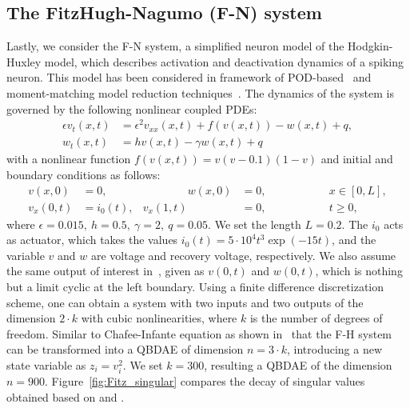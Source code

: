 \subsection{The FitzHugh-Nagumo (F-N) system}
Lastly, we consider the F-N system, a simplified neuron model of the Hodgkin-Huxley model, which describes activation and deactivation dynamics of a spiking neuron. This model has been considered in framework of POD-based~\cite{morChaS10} and moment-matching model reduction techniques~\cite{morBenB12a}. The dynamics of the system is governed by the following nonlinear coupled PDEs:
\begin{equation}
\begin{aligned}
\epsilon v_t(x,t) & =\epsilon^2v_{xx}(x,t) + f(v(x,t)) -w(x,t) + q,\\
w_t(x,t) &= hv(x,t) -\gamma w(x,t) + q
\end{aligned}
\end{equation}
with a nonlinear function $f(v(x,t)) = v(v-0.1)(1-v)$  and initial and boundary conditions as follows:
\begin{equation}
\begin{aligned}
v(x,0) &=0, &\qquad\qquad w(x,0)&=0,\qquad \qquad & &x\in [0,L],\\
v_x(0,t) &= i_0(t), & v_x(1,t) &= 0, & &t\geq 0,
\end{aligned}
\end{equation}
where $\epsilon = 0.015,~h=0.5,~\gamma = 2,~q = 0.05$. We set the length $L = 0.2$. The $i_0$ acts as actuator, which takes the values $i_0(t) = 5\cdot 10^4t^3\exp(-15t)$, and the variable $v$ and $w$ are voltage and recovery voltage, respectively. We also assume the same output of interest in~\cite{morBenB12a}, given as $v(0,t)$ and $w(0,t)$, which is nothing but a limit cyclic at the left boundary. Using a finite difference discretization scheme, one can obtain a system with two inputs and two outputs of the dimension $2\cdot k$ with cubic nonlinearities, where $k$ is the number of degrees of freedom.   Similar to Chafee-Infante equation as shown in~\cite{morBenB12a} that the F-H system can be transformed into a QBDAE of dimension $n = 3\cdot k$, introducing a new state variable as $z_i = v_i^2$. We set $k = 300$, resulting a QBDAE of the dimension $n = 900$.  Figure~\ref{fig:Fitz_singular} compares the decay of singular values obtained based on {\GramQB} and {\GramB}.

